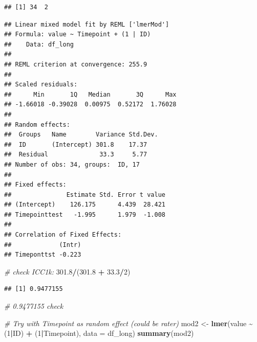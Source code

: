 \documentclass[
]{book}
\newenvironment{Shaded}{\begin{snugshade}}{\end{snugshade}}
\newcommand{\AttributeTok}[1]{\textcolor[rgb]{0.13,0.29,0.53}{#1}}
\newcommand{\CommentTok}[1]{\textcolor[rgb]{0.56,0.35,0.01}{\textit{#1}}}
\newcommand{\DecValTok}[1]{\textcolor[rgb]{0.00,0.00,0.81}{#1}}
\newcommand{\FloatTok}[1]{\textcolor[rgb]{0.00,0.00,0.81}{#1}}
\newcommand{\FunctionTok}[1]{\textcolor[rgb]{0.13,0.29,0.53}{\textbf{#1}}}
\newcommand{\NormalTok}[1]{#1}
\newcommand{\OtherTok}[1]{\textcolor[rgb]{0.56,0.35,0.01}{#1}}
\newcommand{\SpecialCharTok}[1]{\textcolor[rgb]{0.81,0.36,0.00}{\textbf{#1}}}
\begin{document}
\begin{verbatim}
## [1] 34  2
\end{verbatim}

\begin{Shaded}
\end{Shaded}

\begin{verbatim}
## Linear mixed model fit by REML ['lmerMod']
## Formula: value ~ Timepoint + (1 | ID)
##    Data: df_long
## 
## REML criterion at convergence: 255.9
## 
## Scaled residuals: 
##      Min       1Q   Median       3Q      Max 
## -1.66018 -0.39028  0.00975  0.52172  1.76028 
## 
## Random effects:
##  Groups   Name        Variance Std.Dev.
##  ID       (Intercept) 301.8    17.37   
##  Residual              33.3     5.77   
## Number of obs: 34, groups:  ID, 17
## 
## Fixed effects:
##               Estimate Std. Error t value
## (Intercept)    126.175      4.439  28.421
## Timepointtest   -1.995      1.979  -1.008
## 
## Correlation of Fixed Effects:
##             (Intr)
## Timeponttst -0.223
\end{verbatim}

\begin{Shaded}
\begin{Highlighting}[]
\CommentTok{\# check ICC1k:}
\FloatTok{301.8}\SpecialCharTok{/}\NormalTok{(}\FloatTok{301.8} \SpecialCharTok{+} \FloatTok{33.3}\SpecialCharTok{/}\DecValTok{2}\NormalTok{)}
\end{Highlighting}
\end{Shaded}

\begin{verbatim}
## [1] 0.9477155
\end{verbatim}

\begin{Shaded}
\begin{Highlighting}[]
\CommentTok{\# 0.9477155 check}

\CommentTok{\# Try with Timepoint as random effect (could be rater)}
\NormalTok{mod2 }\OtherTok{\textless{}{-}} \FunctionTok{lmer}\NormalTok{(value }\SpecialCharTok{\textasciitilde{}}\NormalTok{ (}\DecValTok{1}\SpecialCharTok{|}\NormalTok{ID) }\SpecialCharTok{+}\NormalTok{ (}\DecValTok{1}\SpecialCharTok{|}\NormalTok{Timepoint), }\AttributeTok{data =}\NormalTok{ df\_long)}
\FunctionTok{summary}\NormalTok{(mod2)}
\end{Highlighting}
\end{Shaded}
\end{document}
